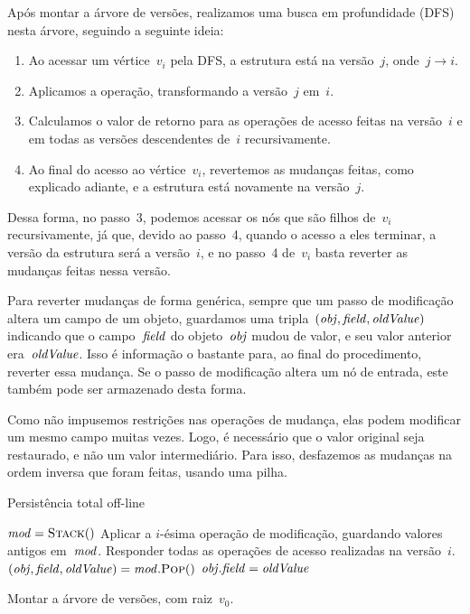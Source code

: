 \documentclass[../../main.tex]{subfiles}
\begin{document}
Após montar a árvore de versões, realizamos uma busca em profundidade (DFS) nesta árvore, seguindo a seguinte ideia:
\begin{enumerate}
	\item Ao acessar um vértice~$v_i$ pela DFS, a estrutura está na versão~$j$, onde~$j \rightarrow i$.
	\item Aplicamos a operação, transformando a versão~$j$ em~$i$.
	\item Calculamos o valor de retorno para as operações de acesso feitas na versão~$i$ e em todas as versões descendentes de~$i$ recursivamente.
	\item Ao final do acesso ao vértice~$v_i$, revertemos as mudanças feitas, como explicado adiante, e a estrutura está novamente na versão~$j$.
\end{enumerate}

Dessa forma, no passo~3, podemos acessar os nós que são filhos de~$v_i$ recursivamente, já que, devido ao passo~4, quando o acesso a eles terminar, a versão da estrutura será a versão~$i$, e no passo~4 de~$v_i$ basta reverter as mudanças feitas nessa versão.

Para reverter mudanças de forma genérica, sempre que um passo de modificação altera um campo de um objeto, guardamos uma tripla~$(\mathit{obj}, \mathit{field}, \mathit{oldValue})$ indicando que o campo~$\mathit{field}$ do objeto~$\mathit{obj}$ mudou de valor, e seu valor anterior era~$\mathit{oldValue}$. Isso é informação o bastante para, ao final do procedimento, reverter essa mudança. Se o passo de modificação altera um nó de entrada, este também pode ser armazenado desta forma.

Como não impusemos restrições nas operações de mudança, elas podem modificar um mesmo campo muitas vezes. Logo, é necessário que o valor original seja restaurado, e não um valor intermediário. Para isso, desfazemos as mudanças na ordem inversa que foram feitas, usando uma pilha.

\begin{algorithm}
\caption{Persistência total off-line} \label{lst:geraloffline}
\begin{algorithmic}[1]

	\State $\V{mod} = \Call{Stack}{\null}$
	\State Aplicar a $i$-ésima operação de modificação, guardando valores antigos em~$\mathit{mod}$.\label{line:off:opmod}
	\State Responder todas as operações de acesso realizadas na versão~$i$. \label{line:off:opac}
	 \label{line:off:for}
		\State {}
	\EndFor
	 \label{line:off:while}
		\State $(\V{obj}, \V{field}, \V{oldValue}) = \V{mod}.\Call{Pop}{\null}$
		\State $\mathit{obj}.\mathit{field} = \mathit{oldValue}$
	\EndWhile
\EndFunction

	\State Montar a árvore de versões, com raiz~$v_0$.
	\State {}
\EndFunction

\end{algorithmic}
\end{algorithm}
\end{document}

